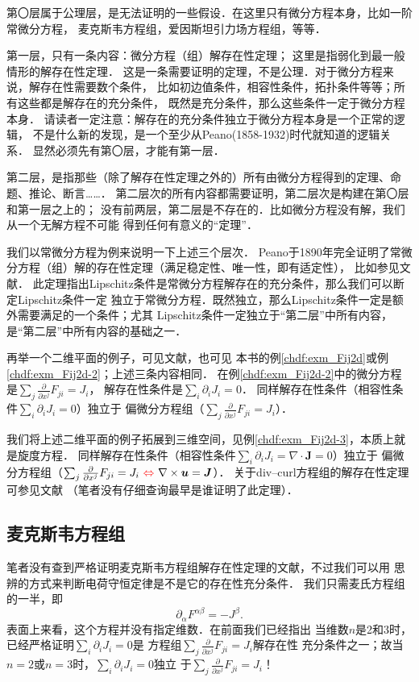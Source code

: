 第〇层属于公理层，是无法证明的一些假设．在这里只有微分方程本身，比如一阶常微分方程，
麦克斯韦方程组，爱因斯坦引力场方程组，等等．

第一层，只有一条内容：微分方程（组）解存在性定理；
这里是指弱化到最一般情形的解存在性定理．
这是一条需要证明的定理，不是公理．对于微分方程来说，解存在性需要数个条件，
比如初边值条件，相容性条件，拓扑条件等等；所有这些都是解存在的充分条件，
既然是充分条件，那么这些条件一定于微分方程本身．
请读者一定注意：解存在的充分条件独立于微分方程本身是一个正常的逻辑，
不是什么新的发现，是一个至少从Peano(1858-1932)时代就知道的逻辑关系．
显然必须先有第〇层，才能有第一层．

第二层，是指那些（除了解存在性定理之外的）所有由微分方程得到的定理、命题、推论、断言……．
第二层次的所有内容都需要证明，第二层次是构建在第〇层和第一层之上的；
没有前两层，第二层是不存在的．比如微分方程没有解，我们从一个无解方程不可能
得到任何有意义的“定理”．

我们以常微分方程为例来说明一下上述三个层次．
Peano于1890年完全证明了常微分方程（组）解的存在性定理（满足稳定性、唯一性，即有适定性），
比如参见文献\parencite[\S 31]{arnold-2001-ode}．
此定理指出Lipschitz条件是常微分方程解存在的充分条件，那么我们可以断定Lipschitz条件一定
独立于常微分方程．既然独立，那么Lipschitz条件一定是额外需要满足的一个条件；尤其
Lipschitz条件一定独立于“第二层”中所有内容，是“第二层”中所有内容的基础之一．

再举一个二维平面的例子，可见文献\parencite[p.16]{courant_hilbert-v2}，也可见
本书的例\ref{chdf:exm_Fij2d}或例\ref{chdf:exm_Fij2d-2}；上述三条内容相同．
在例\ref{chdf:exm_Fij2d-2}中的微分方程是$\sum_{j}\frac{\partial}{\partial x^j} F_{ji} = J_{i} $，
解存在性条件是$\sum_{i} \partial_i J_i = 0$．
同样解存在性条件（相容性条件$\sum_{i} \partial_i J_i = 0$）独立于
偏微分方程组（$\sum_{j}\frac{\partial}{\partial x^j} F_{ji} = J_{i} $）．


我们将上述二维平面的例子拓展到三维空间，见例\ref{chdf:exm_Fij2d-3}，本质上就是旋度方程．
同样解存在性条件（相容性条件$\sum_{i} \partial_i J_i =\nabla \cdot \boldsymbol{J}= 0 $）独立于
偏微分方程组（$\sum_{j}\frac{\partial}{\partial x^j} F_{ji} = J_{i} {\ \color{red}\Leftrightarrow \ }
\nabla\times \boldsymbol{u} = \boldsymbol{J} $）．
关于div--curl方程组的解存在性定理可参见文献\parencite{aramaki-2014}
（笔者没有仔细查询最早是谁证明了此定理）．


\subsection{麦克斯韦方程组}
笔者没有查到严格证明麦克斯韦方程组解存在性定理的文献，不过我们可以用
思辨的方式来判断电荷守恒定律是不是它的存在性充分条件．
我们只需麦氏方程组的一半，即
\begin{equation}\label{chfd:eqn_FJ}
    \partial_{\alpha} F^{\alpha\beta} = - J^{\beta} .
\end{equation}
表面上来看，这个方程并没有指定维数．在前面我们已经指出
当维数$n$是2和3时，已经严格证明$\sum_{i} \partial_i J_i =0$是
方程组$\sum_{j}\frac{\partial}{\partial x^j} F_{ji} = J_{i}$解存在性
充分条件之一；故当$n=2$或$n=3$时，$\sum_{i} \partial_i J_i =0$独立
于$\sum_{j}\frac{\partial}{\partial x^j} F_{ji} = J_{i}$！

